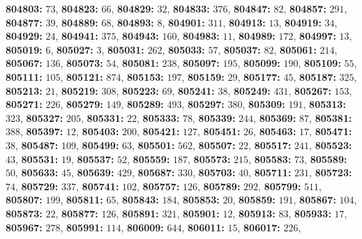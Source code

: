 \textsf{\bfseries 804803:} $73$, \textsf{\bfseries 804823:} $66$, \textsf{\bfseries 804829:} $32$, \textsf{\bfseries 804833:} $376$, \textsf{\bfseries 804847:} $82$, \textsf{\bfseries 804857:} $291$, \textsf{\bfseries 804877:} $39$, \textsf{\bfseries 804889:} $68$, \textsf{\bfseries 804893:} $8$, \textsf{\bfseries 804901:} $311$, \textsf{\bfseries 804913:} $13$, \textsf{\bfseries 804919:} $34$, \textsf{\bfseries 804929:} $24$, \textsf{\bfseries 804941:} $375$, \textsf{\bfseries 804943:} $160$, \textsf{\bfseries 804983:} $11$, \textsf{\bfseries 804989:} $172$, \textsf{\bfseries 804997:} $13$, \textsf{\bfseries 805019:} $6$, \textsf{\bfseries 805027:} $3$, \textsf{\bfseries 805031:} $262$, \textsf{\bfseries 805033:} $57$, \textsf{\bfseries 805037:} $82$, \textsf{\bfseries 805061:} $214$, \textsf{\bfseries 805067:} $136$, \textsf{\bfseries 805073:} $54$, \textsf{\bfseries 805081:} $238$, \textsf{\bfseries 805097:} $195$, \textsf{\bfseries 805099:} $190$, \textsf{\bfseries 805109:} $55$, \textsf{\bfseries 805111:} $105$, \textsf{\bfseries 805121:} $874$, \textsf{\bfseries 805153:} $197$, \textsf{\bfseries 805159:} $29$, \textsf{\bfseries 805177:} $45$, \textsf{\bfseries 805187:} $325$, \textsf{\bfseries 805213:} $21$, \textsf{\bfseries 805219:} $308$, \textsf{\bfseries 805223:} $69$, \textsf{\bfseries 805241:} $38$, \textsf{\bfseries 805249:} $431$, \textsf{\bfseries 805267:} $153$, \textsf{\bfseries 805271:} $226$, \textsf{\bfseries 805279:} $149$, \textsf{\bfseries 805289:} $493$, \textsf{\bfseries 805297:} $380$, \textsf{\bfseries 805309:} $191$, \textsf{\bfseries 805313:} $323$, \textsf{\bfseries 805327:} $205$, \textsf{\bfseries 805331:} $22$, \textsf{\bfseries 805333:} $78$, \textsf{\bfseries 805339:} $244$, \textsf{\bfseries 805369:} $87$, \textsf{\bfseries 805381:} $388$, \textsf{\bfseries 805397:} $12$, \textsf{\bfseries 805403:} $200$, \textsf{\bfseries 805421:} $127$, \textsf{\bfseries 805451:} $26$, \textsf{\bfseries 805463:} $17$, \textsf{\bfseries 805471:} $38$, \textsf{\bfseries 805487:} $109$, \textsf{\bfseries 805499:} $63$, \textsf{\bfseries 805501:} $562$, \textsf{\bfseries 805507:} $22$, \textsf{\bfseries 805517:} $241$, \textsf{\bfseries 805523:} $43$, \textsf{\bfseries 805531:} $19$, \textsf{\bfseries 805537:} $52$, \textsf{\bfseries 805559:} $187$, \textsf{\bfseries 805573:} $215$, \textsf{\bfseries 805583:} $73$, \textsf{\bfseries 805589:} $50$, \textsf{\bfseries 805633:} $45$, \textsf{\bfseries 805639:} $429$, \textsf{\bfseries 805687:} $330$, \textsf{\bfseries 805703:} $40$, \textsf{\bfseries 805711:} $231$, \textsf{\bfseries 805723:} $74$, \textsf{\bfseries 805729:} $337$, \textsf{\bfseries 805741:} $102$, \textsf{\bfseries 805757:} $126$, \textsf{\bfseries 805789:} $292$, \textsf{\bfseries 805799:} $511$, \textsf{\bfseries 805807:} $199$, \textsf{\bfseries 805811:} $65$, \textsf{\bfseries 805843:} $184$, \textsf{\bfseries 805853:} $20$, \textsf{\bfseries 805859:} $191$, \textsf{\bfseries 805867:} $104$, \textsf{\bfseries 805873:} $22$, \textsf{\bfseries 805877:} $126$, \textsf{\bfseries 805891:} $321$, \textsf{\bfseries 805901:} $12$, \textsf{\bfseries 805913:} $83$, \textsf{\bfseries 805933:} $17$, \textsf{\bfseries 805967:} $278$, \textsf{\bfseries 805991:} $114$, \textsf{\bfseries 806009:} $644$, \textsf{\bfseries 806011:} $15$, \textsf{\bfseries 806017:} $226$, 

